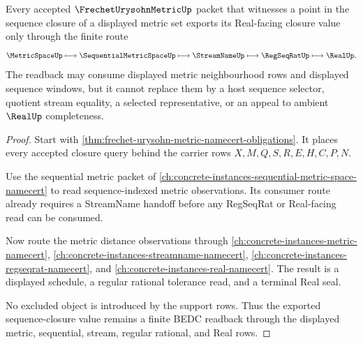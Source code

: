 \begin{theorem}
\label{thm:frechet-urysohn-metric-sequence-readback}
Every accepted $\FrechetUrysohnMetricUp$ packet that witnesses a point in the sequence closure of a displayed metric set exports its Real-facing closure value only through the finite route
$$
\MetricSpaceUp
\longmapsto
\SequentialMetricSpaceUp
\longmapsto
\StreamNameUp
\longmapsto
\RegSeqRatUp
\longmapsto
\RealUp .
$$
The readback may consume displayed metric neighbourhood rows and displayed sequence windows, but it cannot replace them by a host sequence selector, quotient stream equality, a selected representative, or an appeal to ambient $\RealUp$ completeness.
\end{theorem}
\begin{proof}
Start with \autoref{thm:frechet-urysohn-metric-namecert-obligations}. It places every accepted closure query behind the carrier rows $X,M,Q,S,R,E,H,C,P,N$.

Use the sequential metric packet of \autoref{ch:concrete-instances-sequential-metric-space-namecert} to read sequence-indexed metric observations. Its consumer route already requires a StreamName handoff before any RegSeqRat or Real-facing read can be consumed.

Now route the metric distance observations through \autoref{ch:concrete-instances-metric-namecert}, \autoref{ch:concrete-instances-streamname-namecert}, \autoref{ch:concrete-instances-regseqrat-namecert}, and \autoref{ch:concrete-instances-real-namecert}. The result is a displayed schedule, a regular rational tolerance read, and a terminal Real seal.

No excluded object is introduced by the support rows. Thus the exported sequence-closure value remains a finite BEDC readback through the displayed metric, sequential, stream, regular rational, and Real rows.
\end{proof}


